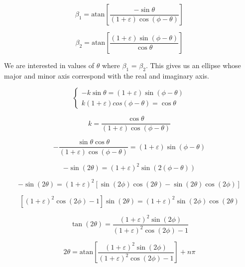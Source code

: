 \documentclass{article}
\begin{document}
\begin{equation}
	\beta_1 = \text{atan}\left[\frac{-\sin\theta}{(1+\varepsilon)\cos(\phi-\theta)}\right]
\end{equation}

\begin{equation}
	\beta_2 = \text{atan}\left[\frac{(1+\varepsilon)\sin(\phi-\theta)}{\cos\theta}\right]
\end{equation}

We are interested in values of $\theta$ where $\beta_1$ = $\beta_2$. This gives us an ellipse whose major and minor axis correspond with the real and imaginary axis.

\begin{equation}
	\begin{cases}
		-k\sin\theta=(1+\varepsilon)\sin(\phi-\theta)\\
		k(1+\varepsilon)cos(\phi-\theta)=\cos\theta
	\end{cases}
\end{equation}

\begin{equation}
	k = \frac{\cos\theta}{(1+\varepsilon)\cos(\phi-\theta)}
\end{equation}

\begin{equation}
	-\frac{\sin\theta\cos\theta}{(1+\varepsilon)\cos(\phi-\theta)}=(1+\varepsilon)\sin(\phi-\theta)
\end{equation}

\begin{equation}
	-\sin(2\theta)=(1+\varepsilon)^2\sin(2(\phi-\theta))
\end{equation}

\begin{equation}
	-\sin(2\theta)=(1+\varepsilon)^2\left[\sin(2\phi)\cos(2\theta) - \sin(2\theta)\cos(2\phi)\right]
\end{equation}

\begin{equation}
	\left[(1+\varepsilon)^2\cos(2\phi)-1\right]\sin(2\theta)=(1+\varepsilon)^2\sin(2\phi)\cos(2\theta)
\end{equation}

\begin{equation}
	\tan(2\theta)=\frac{(1+\varepsilon)^2\sin(2\phi)}{(1+\varepsilon)^2\cos(2\phi)-1}
\end{equation}

\begin{equation}
	2\theta = \text{atan}\left[\frac{(1+\varepsilon)^2\sin(2\phi)}{(1+\varepsilon)^2\cos(2\phi)-1}\right]+n\pi
\end{equation}
\end{document}
